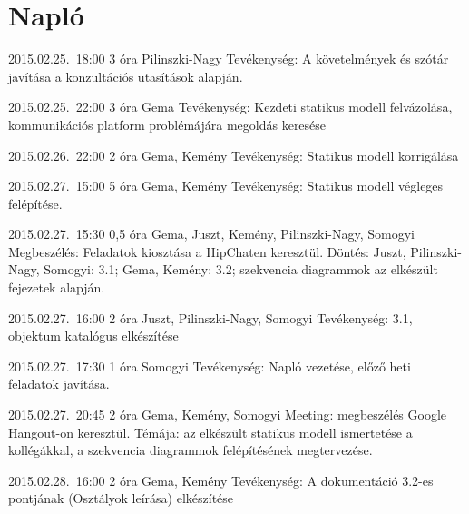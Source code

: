 %
\section{Napló}

\begin{naplo}

\bejegyzes
{2015.02.25.~18:00} %
{3 óra} %
{Pilinszki-Nagy} %
{Tevékenység: A követelmények és szótár javítása a konzultációs utasítások alapján.} %

\bejegyzes
{2015.02.25.~22:00}
{3 óra}
{Gema}
{Tevékenység: Kezdeti statikus modell felvázolása, kommunikációs platform problémájára megoldás keresése}

\bejegyzes
{2015.02.26.~22:00}
{2 óra}
{Gema, Kemény}
{Tevékenység: Statikus modell korrigálása}

\bejegyzes
{2015.02.27.~15:00} %
{5 óra} %
{Gema, Kemény} %
{Tevékenység: Statikus modell végleges felépítése.} %

\bejegyzes
{2015.02.27.~15:30} %
{0,5 óra} %
{Gema, Juszt, Kemény, Pilinszki-Nagy, Somogyi} %
{Megbeszélés: Feladatok kiosztása a HipChaten keresztül. Döntés: Juszt, Pilinszki-Nagy, Somogyi: 3.1; Gema, Kemény: 3.2; szekvencia diagrammok az elkészült fejezetek alapján.} %

\bejegyzes
{2015.02.27.~16:00} %
{2 óra} %
{Juszt, Pilinszki-Nagy, Somogyi} %
{Tevékenység: 3.1, objektum katalógus elkészítése} %

\bejegyzes
{2015.02.27.~17:30} %
{1 óra} %
{Somogyi} %
{Tevékenység: Napló vezetése, előző heti feladatok javítása.} %

\bejegyzes
{2015.02.27.~20:45} %
{2 óra} %
{Gema, Kemény, Somogyi} %
{Meeting: megbeszélés Google Hangout-on keresztül. Témája: az elkészült statikus modell ismertetése a kollégákkal, a szekvencia diagrammok felépítésének megtervezése.} %

\bejegyzes
{2015.02.28.~16:00}
{2 óra}
{Gema, Kemény}
{Tevékenység: A dokumentáció 3.2-es pontjának (Osztályok leírása) elkészítése}

\end{naplo}

